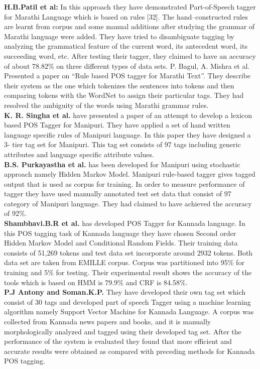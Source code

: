 \documentclass[12pt,a4paper,oneside]{memoir}
\begin{document}
\textbf{H.B.Patil et al:} In this approach they have demonstrated Part-of-Speech tagger for Marathi Language which is based on rules [32]. The hand–constructed rules are learnt from corpus and some manual additions after studying the grammar of Marathi language were added. They have tried to disambiguate tagging by analyzing the grammatical feature of the current word, its antecedent word, its succeeding word, etc. After testing their tagger, they claimed to have an accuracy of about 78.82\% on three different types of data sets. P. Bagul, A. Mishra et al. Presented a paper on “Rule based POS tagger for Marathi Text”. They describe their system as the one which tokenizes the sentences into tokens and then comparing tokens with the WordNet to assign their particular tags. They had resolved the ambiguity of the words using Marathi grammar rules.\\

\textbf{K. R. Singha et al.} have presented a paper of an attempt to develop a lexicon based POS Tagger for Manipuri. They have applied a set of hand written language specific rules of Manipuri language. In this paper they have designed a 3- tier tag set for Manipuri. This tag set consists of 97 tags including generic attributes and language specific attribute values. \\

\textbf{B.S. Purkayastha et al.} has been developed for Manipuri using stochastic approach namely Hidden Markov Model. Manipuri rule-based tagger gives tagged output that is used as corpus for training. In order to measure performance of tagger they have used manually annotated test set data that consist of 97 category of Manipuri language. They had claimed to have achieved the accuracy of 92\%.\\

\textbf{Shambhavi.B.R et al.} has developed POS Tagger for Kannada language. In this POS tagging task of Kannada language they have chosen Second order Hidden Markov Model and Conditional Random Fields. Their training data consists of 51,269 tokens and test data set incorporate around 2932 tokens. Both data set are taken from EMILLE corpus. Corpus was partitioned into 95\% for training and 5\% for testing. Their experimental result shows the accuracy of the tools which is based on HMM is 79.9\% and CRF is 84.58\%.\\ 

\textbf{P.J Antony and Soman.K.P.} They have developed their own tag set which consist of 30 tags and developed part of speech Tagger using a machine learning algorithm namely Support Vector Machine for Kannada Language. A corpus was collected from Kannada news papers and books, and it is manually morphologically analyzed and tagged using their developed tag set. After the performance of the system is evaluated they found that more efficient and accurate results were obtained as compared with preceding methods for Kannada POS tagging.\\
 
\end{document}
